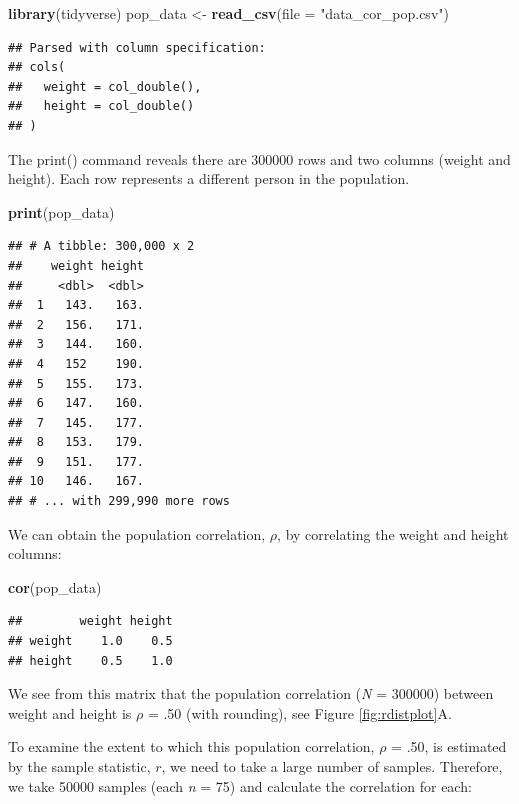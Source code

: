 \documentclass[
]{krantz}
\makeatletter
\newenvironment{Shaded}{\begin{snugshade}}{\end{snugshade}}
\newcommand{\DataTypeTok}[1]{\textcolor[rgb]{0.27,0.27,0.27}{#1}}
\newcommand{\KeywordTok}[1]{\textcolor[rgb]{0.27,0.27,0.27}{\textbf{#1}}}
\newcommand{\NormalTok}[1]{#1}
\newcommand{\StringTok}[1]{\textcolor[rgb]{0.5,0.5,0.5}{#1}}
\newenvironment{kframe}{%
\medskip{}
\setlength{\fboxsep}{.8em}
 \def\at@end@of@kframe{}%
 \ifinner\ifhmode%
  \def\at@end@of@kframe{\end{minipage}}%
  \begin{minipage}{\columnwidth}%
 \fi\fi%
 \def\FrameCommand##1{\hskip\@totalleftmargin \hskip-\fboxsep
 \colorbox{shadecolor}{##1}\hskip-\fboxsep
     \hskip-\linewidth \hskip-\@totalleftmargin \hskip\columnwidth}%
 \MakeFramed {\advance\hsize-\width
   \@totalleftmargin\z@ \linewidth\hsize
   \@setminipage}}%
 {\par\unskip\endMakeFramed%
 \at@end@of@kframe}
\renewenvironment{Shaded}{\begin{kframe}}{\end{kframe}}
\makeatother
\begin{document}
\begin{Shaded}
\begin{Highlighting}[]
\KeywordTok{library}\NormalTok{(tidyverse)}
\NormalTok{pop_data <-}\StringTok{ }\KeywordTok{read_csv}\NormalTok{(}\DataTypeTok{file =} \StringTok{"data_cor_pop.csv"}\NormalTok{)}
\end{Highlighting}
\end{Shaded}

\begin{verbatim}
## Parsed with column specification:
## cols(
##   weight = col_double(),
##   height = col_double()
## )
\end{verbatim}

The print() command reveals there are 300000 rows and two columns (weight and height). Each row represents a different person in the population.

\begin{Shaded}
\begin{Highlighting}[]
\KeywordTok{print}\NormalTok{(pop_data)}
\end{Highlighting}
\end{Shaded}

\begin{verbatim}
## # A tibble: 300,000 x 2
##    weight height
##     <dbl>  <dbl>
##  1   143.   163.
##  2   156.   171.
##  3   144.   160.
##  4   152    190.
##  5   155.   173.
##  6   147.   160.
##  7   145.   177.
##  8   153.   179.
##  9   151.   177.
## 10   146.   167.
## # ... with 299,990 more rows
\end{verbatim}

We can obtain the population correlation, \(\rho\), by correlating the weight and height columns:

\begin{Shaded}
\begin{Highlighting}[]
\KeywordTok{cor}\NormalTok{(pop_data)}
\end{Highlighting}
\end{Shaded}

\begin{verbatim}
##        weight height
## weight    1.0    0.5
## height    0.5    1.0
\end{verbatim}

We see from this matrix that the population correlation (\emph{N} = 300000) between weight and height is \(\rho\) = .50 (with rounding), see Figure \ref{fig:rdistplot}A.

To examine the extent to which this population correlation, \(\rho\) = .50, is estimated by the sample statistic, \(r\), we need to take a large number of samples. Therefore, we take 50000 samples (each \emph{n} = 75) and calculate the correlation for each:
\end{document}

